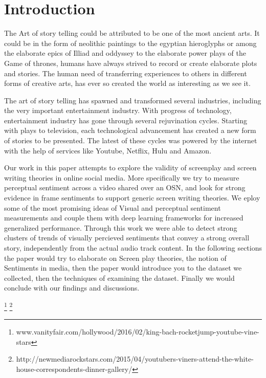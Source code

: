 \section{Introduction}
The Art of story telling could be attributed to be one of the most ancient arts. It could be in the form of neolithic paintings to the egyptian hieroglyphs or among the elaborate epics of Illiad and oddyssey to the elaborate power plays of the Game of thrones, humans have always strived to record or create elaborate plots and stories. The human need of transferring experiences to others in different forms of creative arts, has ever so created the world as interesting as we see it. 
\par
The art of story telling has spawned and transformed several industries, including the very important entertainment industry. With progress of technology, entertainment industry has gone through several rejuvination cycles. Starting with plays to television, each technological advancement has created a new form of stories to be presented. The latest of these cycles was powered by the internet with the help of services like Youtube, Netflix, Hulu and Amazon. 

\par
Our work in this paper attempts to explore the validity of screenplay and screen writing theories in online social media. More specifically we try to measure perceptual sentiment across a video shared over an OSN, and look for strong evidence in frame sentiments to support generic screen writing theories. We eploy some of the most promising ideas of Visual and perceptual sentiment measurements \cite{SentiBank} and couple them with deep learning frameworks for increased generalized performance. Through this work we were able to detect strong clusters of trends of visually percieved sentiments that convey a strong overall story, independently from the actual audio track content. 
In the following sections the paper would try to elaborate on Screen play theories, the notion of Sentiments in media, then the paper would introduce you to the dataset we collected, then the techniques of examining the dataset. Finally we would conclude with our findings and discussions. \cite{7175072}

\footnote{www.vanityfair.com/hollywood/2016/02/king-bach-rocketjump-youtube-vine-stars}
\footnote{http://newmediarockstars.com/2015/04/youtubers-viners-attend-the-white-house-correspondents-dinner-gallery/}